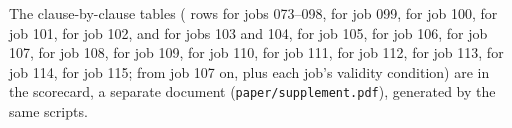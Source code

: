 The clause-by-clause tables (\scClauses{} rows for jobs 073--098, \scbN{} for job 099, \sccN{} for job 100,
\jbClauses{} for job 101, \jdClauses{} for job 102, \jeClauses{} and \jfClauses{} for jobs 103 and 104, \jgClauses{}
for job 105, \jiClauses{} for job 106, \jlClauses{} for job 107, \jmClauses{} for job 108, \olClauses{} for job 109,
\cxTenClauses{} for job 110, \cxClauses{} for job 111, \tcClauses{} for job 112, \hsClauses{} for job 113, \dzClauses{} for job 114, \dqClauses{} for job 115; from job 107 on, plus each job's validity condition) are in the
scorecard, a separate document (\texttt{paper/supplement.pdf}), generated by the same scripts.
